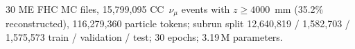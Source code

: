 30 ME FHC MC files, 15{,}799{,}095 CC~$\nu_\mu$ events with $z \ge 4000$~mm (35.2\% reconstructed), 116{,}279{,}360 particle tokens; subrun split 12{,}640{,}819 / 1{,}582{,}703 / 1{,}575{,}573 train / validation / test; 30 epochs; 3.19\,M parameters.
